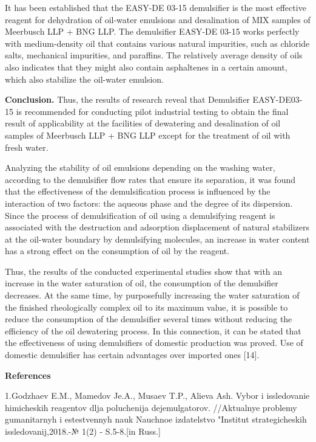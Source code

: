 It has been established that the EASY-DE 03-15 demulsifier is the most
effective reagent for dehydration of oil-water emulsions and
desalination of MIX samples of Meerbusch LLP + BNG LLP. The demulsifier
EASY-DE 03-15 works perfectly with medium-density oil that contains
various natural impurities, such as chloride salts, mechanical
impurities, and paraffins. The relatively average density of oils also
indicates that they might also contain asphaltenes in a certain amount,
which also stabilize the oil-water emulsion.

\textbf{Conclusion.} Thus, the results of research reveal that
Demulsifier EASY-DE03-15 is recommended for conducting pilot industrial
testing to obtain the final result of applicability at the facilities of
dewatering and desalination of oil samples of Meerbusch LLP + BNG LLP
except for the treatment of oil with fresh water.

Analyzing the stability of oil emulsions depending on the washing water,
according to the demulsifier flow rates that ensure its separation, it
was found that the effectiveness of the demulsification process is
influenced by the interaction of two factors: the aqueous phase and the
degree of its dispersion. Since the process of demulsification of oil
using a demulsifying reagent is associated with the destruction and
adsorption displacement of natural stabilizers at the oil-water boundary
by demulsifying molecules, an increase in water content has a strong
effect on the consumption of oil by the reagent.

Thus, the results of the conducted experimental studies show that with
an increase in the water saturation of oil, the consumption of the
demulsifier decreases. At the same time, by purposefully increasing the
water saturation of the finished rheologically complex oil to its
maximum value, it is possible to reduce the consumption of the
demulsifier several times without reducing the efficiency of the oil
dewatering process. In this connection, it can be stated that the
effectiveness of using demulsifiers of domestic production was proved.
Use of domestic demulsifier has certain advantages over imported ones
{[}14{]}.

\textbf{References}

1.Godzhaev E.M., Mamedov Je.A., Musaev T.P., Alieva Ash. Vybor i
issledovanie himicheskih reagentov dlja poluchenija
dejemul\textquotesingle gatorov. //Aktual\textquotesingle nye problemy
gumanitarnyh i estestvennyh nauk Nauchnoe izdatel\textquotesingle stvo
"Institut strategicheskih issledovanij,2018.-№ 1(2) - S.5-8.{[}in
Russ.{]}

